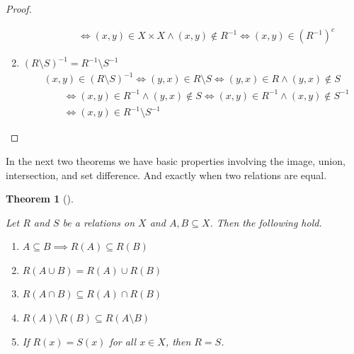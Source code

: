 \documentclass[
  letterpaper,
  10pt,
  reqno,
  twopage,
  openany]{book}
\providecommand{\tightlist}{%
  \setlength{\itemsep}{0pt}\setlength{\parskip}{0pt}}\usepackage{longtable,booktabs,array}
\theoremstyle{plain}
\theoremstyle{definition}
\theoremstyle{definition}
\theoremstyle{definition}
\theoremstyle{plain}
\theoremstyle{plain}
\newtheorem{theorem}{Theorem}[chapter]
\theoremstyle{remark}
\begin{document}
\begin{proof}
\begin{enumerate}
\begin{align*}
  & \qquad \Longleftrightarrow (x,y)\in X\times X \land (x,y)\notin R^{-1} \Longleftrightarrow (x,y)\in (R^{-1})^c 
  \end{align*}
\item
  \((R\setminus S)^{-1}=R^{-1}\setminus S^{-1}\) \begin{align*}
  & (x,y)\in (R\setminus S)^{-1} \Longleftrightarrow (y,x)\in R\setminus S \Longleftrightarrow (y,x)\in R \land (y,x)\notin S\\ 
  & \qquad \Longleftrightarrow (x,y)\in R^{-1} \land (y,x)\notin S \Longleftrightarrow (x,y)\in R^{-1} \land (x,y)\notin S^{-1} \\ 
  & \qquad \Longleftrightarrow (x,y)\in R^{-1}\setminus S^{-1} 
  \end{align*}
\end{enumerate}

\end{proof}

In the next two theorems we have basic properties involving the image,
union, intersection, and set difference. And exactly when two relations
are equal.

\leavevmode{}%
\begin{theorem}[]\label{thm-relations-subseteq}

Let \(R\) and \(S\) be a relations on \(X\) and \(A, B\subseteq X\).
Then the following hold.

\begin{enumerate}
\def\labelenumi{\arabic{enumi}.}
\tightlist
\item
  \(A\subseteq B \implies R(A)\subseteq R(B)\)
\item
  \(R(A\cup B)=R(A)\cup R(B)\)
\item
  \(R(A\cap B)\subseteq R(A)\cap R(B)\)
\item
  \(R(A)\setminus R(B)\subseteq R(A\setminus B)\)
\item
  If \(R(x)=S(x)\) for all \(x\in X\), then \(R=S\).
\end{enumerate}

\end{theorem}
\end{document}
